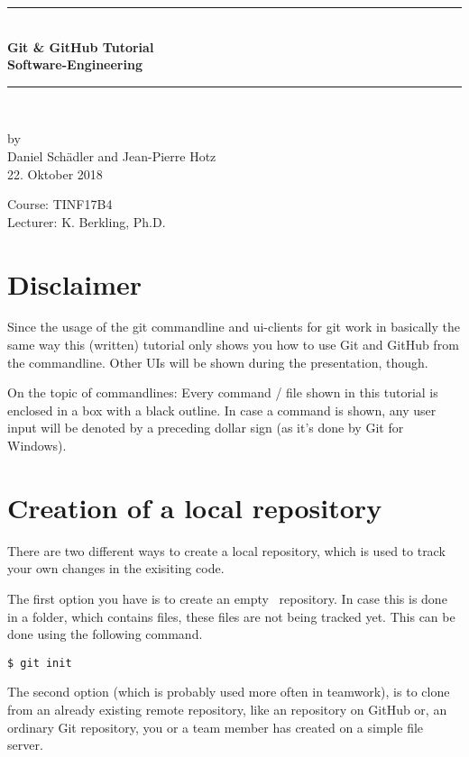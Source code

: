 \documentclass[a4paper, 12pt]{article}
\begin{document}
	
	
	\begin{center}
		\newcommand{\HRule}{\rule{\linewidth}{0.5mm}}
		\HRule \\[0.8cm]
		{ \huge \bfseries Git \& GitHub Tutorial}\\[0.4cm]
		{\LARGE \bfseries Software-Engineering}\\[0.4cm]
		\HRule \\[1.5cm]
		\begin{center}
			by\\[0.2cm]
			Daniel Schädler and Jean-Pierre Hotz\\[0.7cm]
			22. Oktober 2018
		\end{center}
		\vfill
		Course: TINF17B4\\
		Lecturer: K. Berkling, Ph.D.
	\end{center}
	\newpage
	\pagestyle{fancy}

	\section*{Disclaimer}
		
		Since the usage of the git commandline and ui-clients for git work in basically the same way this (written) tutorial only shows you how to use Git and GitHub from the commandline. Other UIs will be shown during the presentation, though.
		
		On the topic of commandlines: Every command / file shown in this tutorial is enclosed in a box with a black outline. In case a command is shown, any user input will be denoted by a preceding dollar sign (as it's done by Git for Windows).
	
	\section{Creation of a local repository}
	
		There are two different ways to create a local repository, which is used to track your own changes in the exisiting code.
		
		The first option you have is to create an \glqq empty\grqq~ repository. In case this is done in a folder, which contains files, these files are not being tracked yet. This can be done using the following command.
		
		\begin{lstlisting}
$ git init
		\end{lstlisting}
		
		The second option (which is probably used more often in teamwork), is to clone from an already existing remote repository, like an repository on GitHub or, an ordinary Git repository, you or a team member has created on a simple file server.
\end{document}
